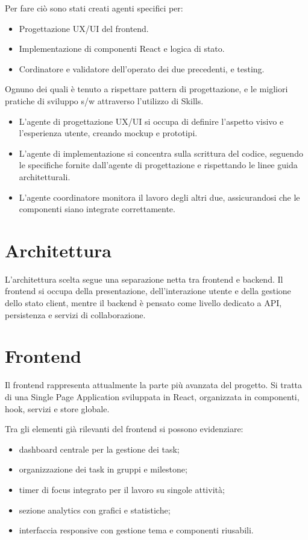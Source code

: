 \documentclass[12pt,a4paper]{article}
\begin{document}
Per fare ciò sono stati creati agenti specifici per:
\begin{itemize}
    \item Progettazione UX/UI del frontend.
    \item Implementazione di componenti React e logica di stato.
    \item Cordinatore e validatore dell'operato dei due precedenti, e testing.
\end{itemize}

Ognuno dei quali è tenuto a rispettare pattern di progettazione, e le migliori pratiche di sviluppo s/w attraverso l'utilizzo di Skills.
\begin{itemize}
    \item L'agente di progettazione UX/UI si occupa di definire l'aspetto visivo e l'esperienza utente, creando mockup e prototipi.
    \item L'agente di implementazione si concentra sulla scrittura del codice, seguendo le specifiche fornite dall'agente di progettazione e rispettando le linee guida architetturali.
    \item L'agente coordinatore monitora il lavoro degli altri due, assicurandosi che le componenti siano integrate correttamente.
\end{itemize}

\section{Architettura}

L'architettura scelta segue una separazione netta tra frontend e backend. Il frontend si occupa della presentazione, dell'interazione utente e della gestione dello stato client, mentre il backend \`e pensato come livello dedicato a API, persistenza e servizi di collaborazione.

\section{Frontend}

Il frontend rappresenta attualmente la parte pi\`u avanzata del progetto. Si tratta di una Single Page Application sviluppata in React, organizzata in componenti, hook, servizi e store globale.

Tra gli elementi gi\`a rilevanti del frontend si possono evidenziare:
\begin{itemize}
    \item dashboard centrale per la gestione dei task;
    \item organizzazione dei task in gruppi e milestone;
    \item timer di focus integrato per il lavoro su singole attivit\`a;
    \item sezione analytics con grafici e statistiche;
    \item interfaccia responsive con gestione tema e componenti riusabili.
\end{itemize}
\end{document}
